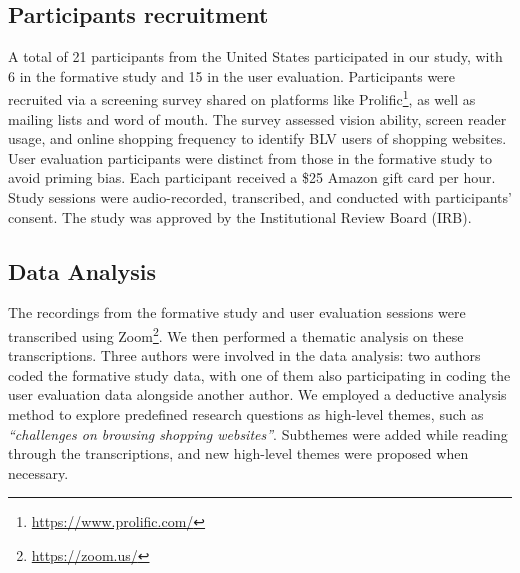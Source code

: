 \subsection{Participants recruitment}
\label{sec:recruit}
A total of 21 participants from the United States participated in our study, with 6 in the formative study and 15 in the user evaluation. Participants were recruited via a screening survey shared on platforms like Prolific\footnote{\url{https://www.prolific.com/}}, as well as mailing lists and word of mouth. The survey assessed vision ability, screen reader usage, and online shopping frequency to identify BLV users of shopping websites. User evaluation participants were distinct from those in the formative study to avoid priming bias. Each participant received a \$25 Amazon gift card per hour. Study sessions were audio-recorded, transcribed, and conducted with participants’ consent. The study was approved by the Institutional Review Board (IRB).



\subsection{Data Analysis}
\label{sec:data_ana}
The recordings from the formative study and user evaluation sessions were transcribed using Zoom\footnote{\url{https://zoom.us/}}. We then performed a thematic analysis \cite{braun2006using} on these transcriptions. Three authors were involved in the data analysis: two authors coded the formative study data, with one of them also participating in coding the user evaluation data alongside another author. We employed a deductive analysis method to explore predefined research questions as high-level themes, such as \textit{``challenges on browsing shopping websites''}. Subthemes were added while reading through the transcriptions, and new high-level themes were proposed when necessary.

